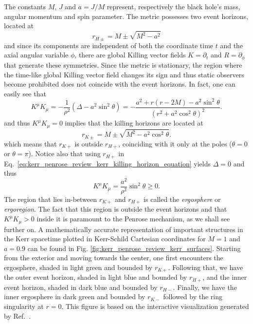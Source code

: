 The constants $M$, $J$ and $a = J/M$ represent, respectively the black hole's mass, angular momentum and spin parameter. The metric possesses two event horizons, located at
%
\begin{equation}
  r_{H\pm} = M \pm \sqrt{M^2 - a^2}
  \label{eq:kerr_penrose_review_kerr_horizons}
\end{equation}
%
and since its components are independent of both the coordinate time $t$ and the axial angular variable $\phi$, there are global Killing vector fields $K = \partial_t$ and $R = \partial_\phi$ that generate these symmetries. Since the metric is stationary, the region where the time-like global Killing vector field changes its sign and thus static observers become prohibited does not coincide with the event horizons. In fact, one can easily see that
%
\begin{equation}
  K^\mu K_\mu = -\frac{1}{\rho^2}\left({\Delta - a^2 \sin^2\theta}\right) = -\frac{a^2 + r(r-2M)-a^2\sin^2\theta}{(r^2+a^2\cos^2\theta)^2}.
  \label{eq:kerr_penrose_review_kerr_killing_horizon_equation}
\end{equation}
%
and thus $K^\mu K_\mu = 0$ implies that the killing horizons are located at
%
\begin{equation}
  r_{K\pm} = M \pm \sqrt{M^2 - a^2\cos^2\theta}.
  \label{eq:kerr_penrose_review_kerr_killing_horizon_solution}
\end{equation}
%
which means that $r_{K+}$ is outside $r_{H+}$, coinciding with it only at the poles ($\theta=0$ or $\theta=\pi$). Notice also that using $r_{H+}$ in Eq.~\eqref{eq:kerr_penrose_review_kerr_killing_horizon_equation} yields $\Delta=0$ and thus
%
\begin{equation}
  K^\mu K_\mu = \frac{a^2}{\rho^2}\sin^2\theta \geq 0.
  \label{eq:kerr_penrose_review_kerr_killing_horizon_solution_2}
\end{equation}
%
The region that lies in-between $r_{K+}$ and $r_{H+}$ is called the \emph{ergosphere} or \emph{ergoregion}. The fact that this region is outside the event horizons and that $K^\mu K_\mu>0$ inside it is paramount to the Penrose mechanism, as we shall see further on. A mathematically accurate representation of important structures in the Kerr spacetime plotted in Kerr-Schild Cartesian coordinates for $M=1$ and $a=0.9$ can be found in Fig. \ref{fig:kerr_penrose_review_kerr_surfaces}. Starting from the exterior and moving towards the center, one first encounters the ergosphere, shaded in light green and bounded by $r_{K+}$. Following that, we have the outer event horizon, shaded in light blue and bounded by $r_{H+}$, and the inner event horizon, shaded in dark blue and bounded by $r_{H-}$. Finally, we have the inner ergosphere in dark green and bounded by $r_{K-}$ followed by the ring singularity at $r=0$. This figure is based on the interactive visualization generated by Ref.~\cite{KerrSurfaceViz}.


